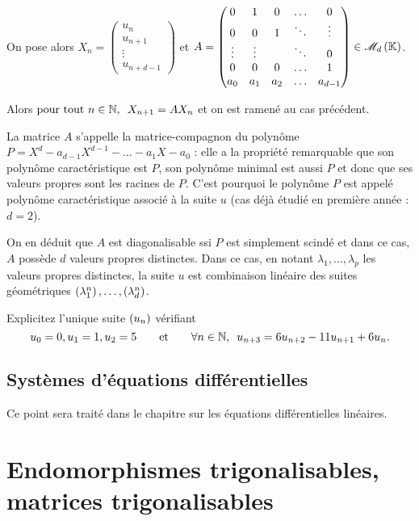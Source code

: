 On pose alors \(X_n=\begin{pmatrix}
u_n \\
u_{n+1} \\
\vdots \\
u_{n+d-1}
\end{pmatrix}\) et \(A=\begin{pmatrix}
0 & 1 & 0 & \dots & 0 \\
0 & 0 & 1 & \ddots & \vdots \\
\vdots & \vdots &  & \ddots & 0 \\
0 & 0 & 0 & \dots & 1 \\
a_0 & a_1 & a_2 & \dots & a_{d-1}
\end{pmatrix}\in\M{d}\).

Alors \(\quantifs{\tpt n\in\N}X_{n+1}=AX_n\) et on est ramené au cas précédent.

La matrice \(A\) s'appelle la matrice-compagnon du polynôme \(P=X^d-a_{d-1}X^{d-1}-\dots-a_1X-a_0\) : elle a la propriété remarquable que son polynôme caractéristique est \(P\), son polynôme minimal est aussi \(P\) et donc que ses valeurs propres sont les racines de \(P\). C'est pourquoi le polynôme \(P\) est appelé polynôme caractéristique associé à la suite \(u\) (cas déjà étudié en première année : \(d=2\)).

On en déduit que \(A\) est diagonalisable ssi \(P\) est simplement scindé et dans ce cas, \(A\) possède \(d\) valeurs propres distinctes. Dans ce cas, en notant \(\lambda_1,\dots,\lambda_p\) les valeurs propres distinctes, la suite \(u\) est combinaison linéaire des suites géométriques \(\left(\lambda_1^n\right),\dots,\left(\lambda_d^n\right)\).

\begin{exo}
Explicitez l'unique suite \(\left(u_n\right)\) vérifiant \[u_0=0,u_1=1,u_2=5\qquad\text{et}\qquad\quantifs{\forall n\in\N}u_{n+3}=6u_{n+2}-11u_{n+1}+6u_n.\]
\end{exo}

\subsection{Systèmes d'équations différentielles}

Ce point sera traité dans le chapitre sur les équations différentielles linéaires.

\section{Endomorphismes trigonalisables, matrices trigonalisables}

